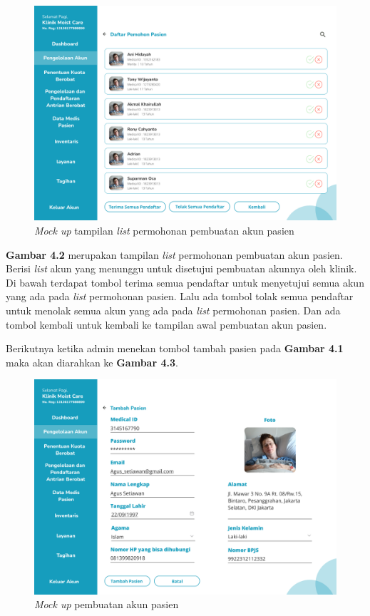 \begin{enumerate}
	\begin{figure}[H]
		\centering
		\includegraphics[width=12cm]{gambar/mockup_web/Pembuatan Akun 2.png}
		\caption{\emph{Mock up} tampilan \emph{list} permohonan  pembuatan akun pasien}
		\label{Gambar:listpermohonanpembuatanakunpasien}
	\end{figure}

	\textbf{Gambar 4.2} merupakan tampilan \emph{list} permohonan pembuatan akun pasien. Berisi \emph{list} akun yang menunggu untuk disetujui pembuatan akunnya oleh klinik. Di bawah terdapat tombol terima semua pendaftar untuk menyetujui semua akun yang ada pada \emph{list} permohonan pasien. 	Lalu ada tombol tolak semua pendaftar untuk menolak semua akun yang ada pada \emph{list} permohonan pasien. Dan ada tombol kembali untuk kembali ke tampilan awal pembuatan akun pasien.
	
	Berikutnya ketika admin menekan tombol tambah pasien pada \textbf{Gambar 4.1} maka akan diarahkan ke \textbf{Gambar 4.3}. 
	
	\begin{figure}[H]
		\centering
		\includegraphics[width=12cm]{gambar/mockup_web/Pembuatan Akun 3.png}
		\caption{\emph{Mock up} pembuatan akun pasien}
		\label{Gambar:pembuatanakunpasien}
	\end{figure}
	

\end{enumerate}
